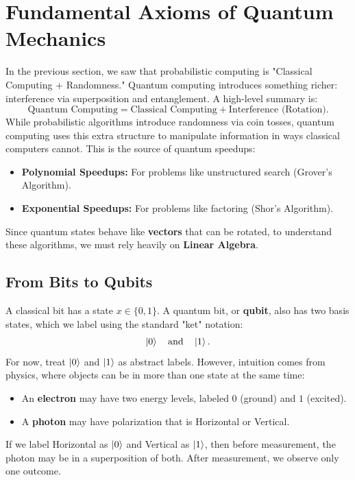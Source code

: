 \section{Fundamental Axioms of Quantum Mechanics}

In the previous section, we saw that probabilistic computing is "Classical Computing + Randomness."
Quantum computing introduces something richer: interference via superposition and entanglement. A high-level summary is:
\[
    \text{Quantum Computing} = \text{Classical Computing} + \text{Interference (Rotation)}.
\]
While probabilistic algorithms introduce randomness via coin tosses, quantum computing uses this extra structure to manipulate information in ways classical computers cannot. This is the source of quantum speedups:
\begin{itemize}
    \item \textbf{Polynomial Speedups:} For problems like unstructured search (Grover's Algorithm).
    \item \textbf{Exponential Speedups:} For problems like factoring (Shor's Algorithm). \cite{NC10}
\end{itemize}

Since quantum states behave like \textbf{vectors} that can be rotated, to understand these algorithms, we must rely heavily on \textbf{Linear Algebra}.

\subsection{From Bits to Qubits}

A classical bit has a state $x \in \{0, 1\}$.
A quantum bit, or \textbf{qubit}, also has two basis states, which we label using the standard "ket" notation:
\[
    \ket{0} \quad \text{and} \quad \ket{1}.
\]
For now, treat $\ket{0}$ and $\ket{1}$ as abstract labels. However, intuition comes from physics, where objects can be in more than one state at the same time:
\begin{itemize}
    \item An \textbf{electron} may have two energy levels, labeled $0$ (ground) and $1$ (excited).
    \item A \textbf{photon} may have polarization that is Horizontal or Vertical.
\end{itemize}
If we label Horizontal as $\ket{0}$ and Vertical as $\ket{1}$, then before measurement, the photon may be in a superposition of both. After measurement, we observe only one outcome.

